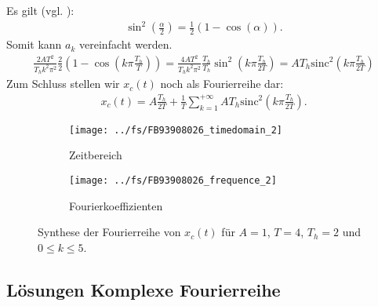 \documentclass[11pt,a4paper,DIV=12]{scrartcl}
\newcommand{\sinc}{\mathrm{sinc}}
\begin{document}
%
%
%
Es gilt (vgl. \cite[Kap. 2, S. 82]{Bronstein2015}):
%
\begin{gather}
	\sin^2\left(\frac{\alpha}{2}\right)=\frac{1}{2}(1-\cos(\alpha)).
\end{gather}
%
Somit kann $a_k$ vereinfacht werden.
\begin{gather}
	\frac{2AT^2}{T_hk^2\pi^2}\frac{2}{2}\left (1-\cos\left(k\pi\frac{T_h}{T}\right)\right )
	=\frac{4AT^2}{T_hk^2\pi^2}\frac{T_h}{T_h}\sin^2\left(k\pi\frac{T_h}{2T}\right)
	=AT_h\sinc^2\left(k\pi\frac{T_h}{2T}\right)
\end{gather}
%
Zum Schluss stellen wir $x_{c}(t)$ noch als Fourierreihe dar:
%
\begin{align}
	x_{c}(t)
	=A\frac{T_h}{2T}+\frac{1}{T}\sum_{k=1}^{+\infty}AT_h\sinc^2\left(k\pi\frac{T_h}{2T}\right).
\end{align}
%
\begin{figure}
	\centering
	\begin{subfigure}{\textwidth}
		\texttt{[image: ../fs/FB93908026\_timedomain\_2]}
		\caption{Zeitbereich}
	\end{subfigure}
	\begin{subfigure}{\textwidth}
		\texttt{[image: ../fs/FB93908026\_frequence\_2]}
		\caption{Fourierkoeffizienten}
	\end{subfigure}
	\caption{Synthese der Fourierreihe von $x_c(t)$ für $A=1$, $T=4$, $T_h=2$ und
		$0\leq k\leq5$.}
\end{figure}

\newpage
\subsection{Lösungen Komplexe Fourierreihe}
\end{document}
